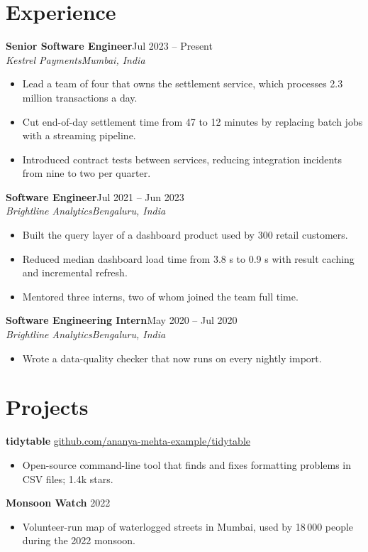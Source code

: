 \documentclass[10pt,a4paper]{article}
\newcommand{\entry}[4]{\textbf{#1}\hfill #2\\\textit{#3}\hfill \textit{#4}\par\vspace{1pt}}
\begin{document}
\section{Experience}
\entry{Senior Software Engineer}{Jul 2023 -- Present}{Kestrel Payments}{Mumbai, India}
\begin{itemize}
  \item Lead a team of four that owns the settlement service, which processes 2.3 million transactions a day.
  \item Cut end-of-day settlement time from 47 to 12 minutes by replacing batch jobs with a streaming pipeline.
  \item Introduced contract tests between services, reducing integration incidents from nine to two per quarter.
\end{itemize}
\vspace{3pt}
\entry{Software Engineer}{Jul 2021 -- Jun 2023}{Brightline Analytics}{Bengaluru, India}
\begin{itemize}
  \item Built the query layer of a dashboard product used by 300 retail customers.
  \item Reduced median dashboard load time from 3.8 s to 0.9 s with result caching and incremental refresh.
  \item Mentored three interns, two of whom joined the team full time.
\end{itemize}
\vspace{3pt}
\entry{Software Engineering Intern}{May 2020 -- Jul 2020}{Brightline Analytics}{Bengaluru, India}
\begin{itemize}
  \item Wrote a data-quality checker that now runs on every nightly import.
\end{itemize}

\section{Projects}
\textbf{tidytable} \hfill \href{https://github.com/ananya-mehta-example/tidytable}{github.com/ananya-mehta-example/tidytable}
\begin{itemize}
  \item Open-source command-line tool that finds and fixes formatting problems in CSV files; 1.4k stars.
\end{itemize}
\textbf{Monsoon Watch} \hfill 2022
\begin{itemize}
  \item Volunteer-run map of waterlogged streets in Mumbai, used by 18\,000 people during the 2022 monsoon.
\end{itemize}
\end{document}
